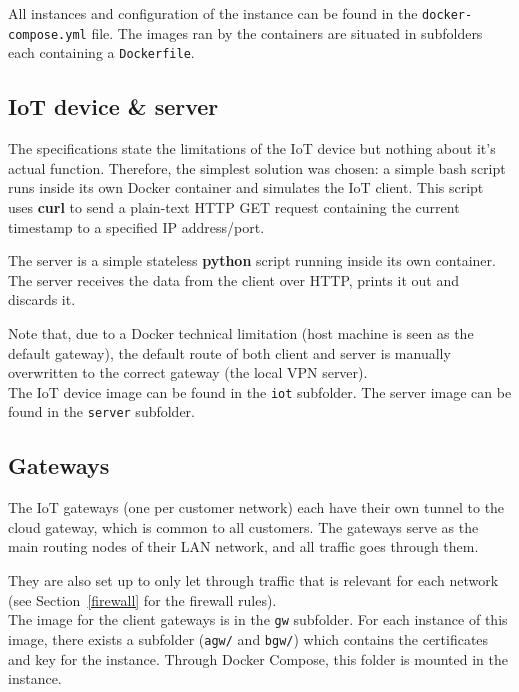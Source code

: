 \documentclass[paper=a4, fontsize=11pt]{scrartcl}
\begin{document}
All instances and configuration of the instance can be found in the
\texttt{docker-compose.yml} file.
The images ran by the containers are situated in subfolders each containing a
\texttt{Dockerfile}.

\subsection{IoT device \& server}

The specifications state the limitations of the IoT device but nothing about
it's actual function.
Therefore, the simplest solution was chosen: a simple bash script runs inside
its own Docker container and simulates the IoT client.
This script uses \textbf{curl} to send a plain-text HTTP GET request containing the
current timestamp to a specified IP address/port.

The server is a simple stateless \textbf{python} script running inside its
own container.
The server receives the data from the client over HTTP, prints it out and
discards it.

Note that, due to a Docker technical limitation (host machine is seen as the
default gateway), the default route of both client and server is manually
overwritten to the correct gateway (the local VPN server).
\\

The IoT device image can be found in the \texttt{iot} subfolder.
The server image can be found in the \texttt{server} subfolder.

\subsection{Gateways}

The IoT gateways (one per customer network) each have their own tunnel to the
cloud gateway, which is common to all customers.
The gateways serve as the main routing nodes of their LAN network, and all
traffic goes through them.

They are also set up to only let through traffic that is relevant for each
network (see Section~\ref{firewall} for the firewall rules).
\\

The image for the client gateways is in the \texttt{gw} subfolder.
For each instance of this image, there exists a subfolder (\texttt{agw/} and
\texttt{bgw/}) which contains the certificates and key for the instance.
Through Docker Compose, this folder is mounted in the instance.
\end{document}
